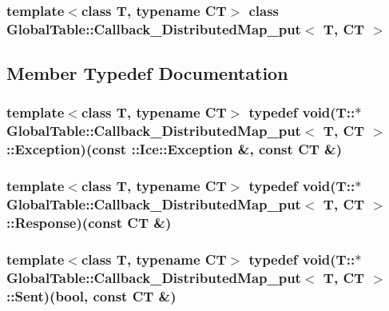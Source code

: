 \subsubsection*{template$<$class T, typename CT$>$ class GlobalTable::Callback\_\-DistributedMap\_\-put$<$ T, CT $>$}



\subsection{Member Typedef Documentation}
\hypertarget{class_global_table_1_1_callback___distributed_map__put_a0bb5bf4250e4c3dce4cf4dfc11d0987b}{
\subsubsection[{Exception}]{\setlength{\rightskip}{0pt plus 5cm}template$<$class T, typename CT$>$ typedef void(T::$\ast$ {\bf GlobalTable::Callback\_\-DistributedMap\_\-put}$<$ T, CT $>$::{\bf Exception})(const ::Ice::Exception \&, const CT \&)}}
\label{class_global_table_1_1_callback___distributed_map__put_a0bb5bf4250e4c3dce4cf4dfc11d0987b}
\hypertarget{class_global_table_1_1_callback___distributed_map__put_a4b50418baab520b5caa0c4eaf74af95c}{
\subsubsection[{Response}]{\setlength{\rightskip}{0pt plus 5cm}template$<$class T, typename CT$>$ typedef void(T::$\ast$ {\bf GlobalTable::Callback\_\-DistributedMap\_\-put}$<$ T, CT $>$::{\bf Response})(const CT \&)}}
\label{class_global_table_1_1_callback___distributed_map__put_a4b50418baab520b5caa0c4eaf74af95c}
\hypertarget{class_global_table_1_1_callback___distributed_map__put_a737246880284bb296cbf1ba7d00773ee}{
\subsubsection[{Sent}]{\setlength{\rightskip}{0pt plus 5cm}template$<$class T, typename CT$>$ typedef void(T::$\ast$ {\bf GlobalTable::Callback\_\-DistributedMap\_\-put}$<$ T, CT $>$::{\bf Sent})(bool, const CT \&)}}
